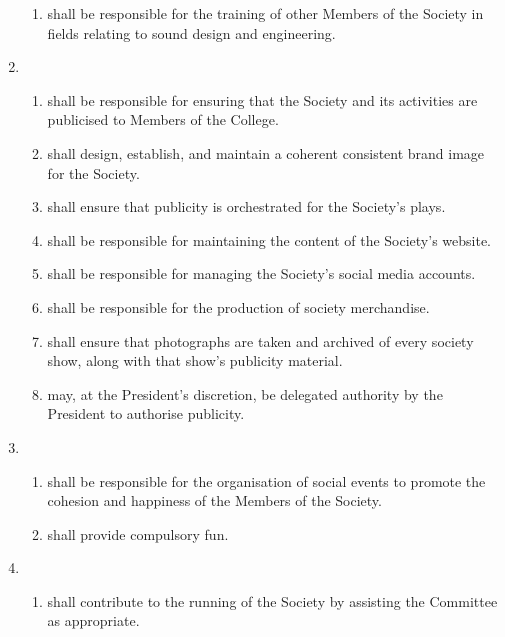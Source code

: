 \documentclass[a4paper]{tufte-handout}
\newcommand{\policyOffset}{12pt}
\newcommand{\policyPub}[2][\policyOffset]{\marginnote[#1]{\textsc{Publicity Policy \S#2}}}
\begin{document}
\begin{enumerate}[resume]
\begin{enumerate}
            \item shall be responsible for the training of other Members of the Society in fields relating to sound design and engineering.
        \end{enumerate}
    \item {}
        \begin{enumerate}
            \item shall be responsible for ensuring that the Society and its activities are publicised to Members of the College.
            \item shall design, establish, and maintain a coherent consistent brand image for the Society.
            \item shall ensure that publicity is orchestrated for the Society's plays.
            \item shall be responsible for maintaining the content of the Society's website.
            \item shall be responsible for managing the Society's social media accounts.
            \item shall be responsible for the production of society merchandise.
            \item shall ensure that photographs are taken and archived of every society show, along with that show's publicity material.
            \item \policyPub{4} may, at the President's discretion, be delegated authority by the President to authorise publicity.
        \end{enumerate}
    \item {}
        \begin{enumerate}
            \item shall be responsible for the organisation of social events to promote the cohesion and happiness of the Members of the Society.
            \item shall provide compulsory fun.
        \end{enumerate}
    \item {}
        \begin{enumerate}
            \item shall contribute to the running of the Society by assisting the Committee as appropriate.
        \end{enumerate}
\end{enumerate}
\end{document}

